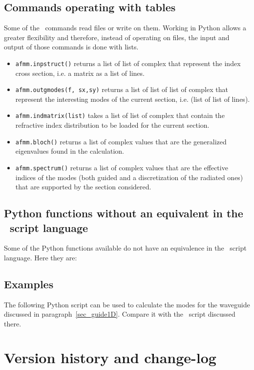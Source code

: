 \section{Commands operating with tables}
Some of the \afmm\ commands read files or write on them. Working in Python allows a greater flexibility and therefore, instead of operating on files, the input and output of those commands is done with lists.

\begin{itemize}
\item \lstinline!afmm.inpstruct()! 
returns a list of list of complex that represent the index cross section, i.e. a matrix as a list of lines.
\item \lstinline!afmm.outgmodes(f, sx,sy)! returns a list of list of list of complex that represent the interesting modes of the current section, i.e. (list of list of lines).
\item \lstinline!afmm.indmatrix(list)! takes a list of list of complex that contain the refractive index distribution to be loaded for the current section.
\item \lstinline!afmm.bloch()! returns a list of complex values that are the generalized eigenvalues found in the calculation.
\item \lstinline!afmm.spectrum()! returns a list of complex values that are the effective indices of the modes (both guided and a discretization of the radiated ones) that are supported by the section considered.
\end{itemize}

\section{Python functions without an equivalent in the \afmm\ script language}
Some of the Python functions available do not have an equivalence in the \afmm\ script language. Here they are:


\section{Examples}
The following Python script can be used to calculate the modes for the waveguide discussed in paragraph~\ref{sec_guide1D}. Compare it with the \afmm\ script discussed there.


\chapter{Version history and change-log}

